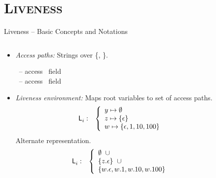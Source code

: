 \documentclass[xcolor=x11names,compress,mathserif]{beamer}
\renewcommand{\(}{\begin{columns}}
\renewcommand{\)}{\end{columns}}
\newcommand{\<}[1]{\begin{column}{#1}}
\renewcommand{\>}{\end{column}}
\begin{document}
\section{\scshape Liveness}
\begin{frame}{Liveness -- Basic Concepts and Notations}
\small
\begin{columns}
  \begin{column}[T]{0.75\textwidth}
  \begin{itemize}\itemsep0.75em
  \item {\em Access paths:} Strings over \{\acar, \acdr\}.

\hspace*{.25cm}   \acar\  -- access \CAR\ field \\
\hspace*{.25cm}   \acdr\  -- access \CDR\ field 

  \item {\em Liveness environment:} 
{Maps root variables    to set of access paths.
\begin{eqnarray*}
\mathsf{L}_{{i}}^{}&:&
\left\{\begin{array}{l}
 y \mapsto \emptyset\\
       z \mapsto \{\epsilon\}\\
       w \mapsto \{\epsilon, 1, 10, 100\}
    \end{array}\right.
\end{eqnarray*}
}
{Alternate representation.
\begin{eqnarray*}
\mathsf{L}_{{i}}^{}&:&
\left\{\begin{array}{l}
        \emptyset \;\; \cup  \\
        \{z.\epsilon\} \;\; \cup\\
        \{w.\epsilon, w.1, w.10, w.100\}
     \end{array}\right.
\end{eqnarray*} 
}
  \end{itemize}
  \end{column}
\begin{column}[T]{0.25\textwidth}
\end{column}
\end{columns}

\bigskip
\bigskip

\end{frame}
\end{document}
